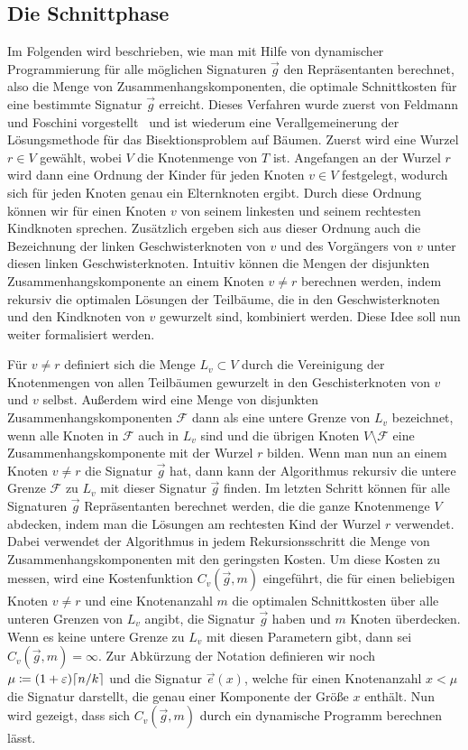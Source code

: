 \subsection{Die Schnittphase}\label{sec:cutting}
Im Folgenden wird beschrieben, wie man mit Hilfe von dynamischer Programmierung für alle möglichen Signaturen $\vec{g}$ den Repräsentanten berechnet, also die Menge von Zusammenhangskomponenten, die optimale Schnittkosten für eine bestimmte Signatur $\vec{g}$ erreicht.
Dieses Verfahren wurde zuerst von Feldmann und Foschini vorgestellt~\parencite{ff13} und ist wiederum eine Verallgemeinerung der Lösungsmethode für das Bisektionsproblem auf Bäumen. \parencite{mcg78, ws11}
Zuerst wird eine Wurzel $r \in V$ gewählt, wobei $V$ die Knotenmenge von $T$ ist. 
Angefangen an der Wurzel $r$ wird dann eine Ordnung der Kinder für jeden Knoten $v \in V$ festgelegt, wodurch sich für jeden Knoten genau ein Elternknoten ergibt.
Durch diese Ordnung können wir für einen Knoten $v$ von seinem linkesten und seinem rechtesten Kindknoten sprechen. 
Zusätzlich ergeben sich aus dieser Ordnung auch die Bezeichnung der linken Geschwisterknoten von $v$ und des Vorgängers von $v$ unter diesen linken Geschwisterknoten.
Intuitiv können die Mengen der disjunkten Zusammenhangskomponente an einem Knoten $v \neq r$ berechnen werden, indem rekursiv die optimalen Lösungen der Teilbäume, die in den Geschwisterknoten und den Kindknoten von $v$ gewurzelt sind, kombiniert werden.
Diese Idee soll nun weiter formalisiert werden.

Für $v \neq r$ definiert sich die Menge $L_v \subset V$ durch die Vereinigung der Knotenmengen von allen Teilbäumen gewurzelt in den Geschisterknoten von $v$ und $v$ selbst.
Außerdem wird eine Menge von disjunkten Zusammenhangskomponenten $\mathcal{F}$ dann als eine untere Grenze von $L_v$ bezeichnet, wenn alle Knoten in $\mathcal{F}$ auch in $L_v$ sind und die übrigen Knoten $V \setminus \mathcal{F}$ eine Zusammenhangskomponente mit der Wurzel $r$ bilden.
Wenn man nun an einem Knoten $v \neq r$ die Signatur $\vec{g}$ hat, dann kann der Algorithmus rekursiv die untere Grenze $\mathcal{F}$ zu $L_v$ mit dieser Signatur $\vec{g}$ finden.
Im letzten Schritt können für alle Signaturen $\vec{g}$ Repräsentanten berechnet werden, die die ganze Knotenmenge $V$ abdecken, indem man die Lösungen am rechtesten Kind der Wurzel $r$ verwendet.
Dabei verwendet der Algorithmus in jedem Rekursionsschritt die Menge von Zusammenhangskomponenten mit den geringsten Kosten. 
Um diese Kosten zu messen, wird eine Kostenfunktion $C_v(\vec{g}, m)$ eingeführt, die für einen beliebigen Knoten $v \neq r$ und eine Knotenanzahl $m$ die optimalen Schnittkosten über alle unteren Grenzen von $L_v$ angibt, die Signatur $\vec{g}$ haben und $m$ Knoten überdecken.
Wenn es keine untere Grenze zu $L_v$ mit diesen Parametern gibt, dann sei $C_v(\vec{g}, m) = \infty$.
Zur Abkürzung der Notation definieren wir noch $\mu \coloneqq (1+\eps)\ceil*{n/k}$ und die Signatur $\vec{e}(x)$, welche für einen Knotenanzahl $x < \mu$ die Signatur darstellt, die genau einer Komponente der Größe $x$ enthält.
Nun wird gezeigt, dass sich $C_v(\vec{g}, m)$ durch ein dynamische Programm berechnen lässt.


